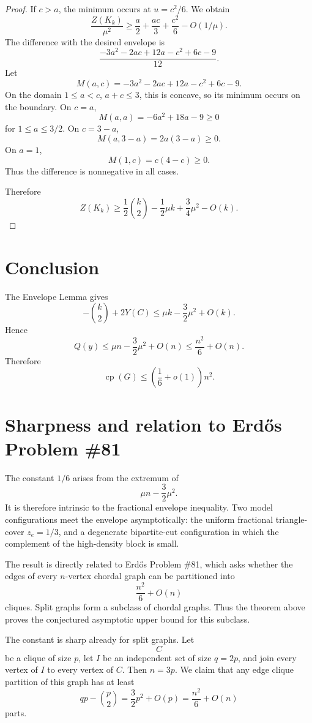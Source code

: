 \documentclass[11pt]{article}
\newcommand{\cp}{\operatorname{cp}}
\begin{document}
\begin{proof}
If \(c>a\), the minimum occurs at \(u=c^2/6\). We obtain
\[
    \frac{Z(K_k)}{\mu^2}
    \ge
    \frac a2+\frac{ac}{3}+\frac{c^2}{6}-O(1/\mu).
\]
The difference with the desired envelope is
\[
    \frac{-3a^2-2ac+12a-c^2+6c-9}{12}.
\]
Let
\[
    M(a,c)=-3a^2-2ac+12a-c^2+6c-9.
\]
On the domain \(1\le a<c\), \(a+c\le3\), this is concave, so its minimum occurs on the boundary. On \(c=a\),
\[
    M(a,a)=-6a^2+18a-9\ge0
\]
for \(1\le a\le3/2\). On \(c=3-a\),
\[
    M(a,3-a)=2a(3-a)\ge0.
\]
On \(a=1\),
\[
    M(1,c)=c(4-c)\ge0.
\]
Thus the difference is nonnegative in all cases.

Therefore
\[
    Z(K_k)
    \ge
    \frac12\binom{k}{2}
    -
    \frac12\mu k
    +
    \frac34\mu^2
    -
    O(k).
\]
\end{proof}

\section{Conclusion}

The Envelope Lemma gives
\[
    -\binom{k}{2}+2Y(C)
    \le
    \mu k-\frac32\mu^2+O(k).
\]
Hence
\[
    Q(y)
    \le
    \mu n-\frac32\mu^2+O(n)
    \le
    \frac{n^2}{6}+O(n).
\]
Therefore
\[
    \cp(G)
    \le
    \left(\frac16+o(1)\right)n^2.
\]

\section{Sharpness and relation to Erdős Problem \#81}\label{sec:sharpness}

The constant \(1/6\) arises from the extremum of
\[
    \mu n-\frac32\mu^2.
\]
It is therefore intrinsic to the fractional envelope inequality. Two model configurations meet the envelope asymptotically: the uniform fractional triangle-cover \(z_e=1/3\), and a degenerate bipartite-cut configuration in which the complement of the high-density block is small.

The result is directly related to Erdős Problem \#81, which asks whether the edges of every \(n\)-vertex chordal graph can be partitioned into
\[
    \frac{n^2}{6}+O(n)
\]
cliques. Split graphs form a subclass of chordal graphs. Thus the theorem above proves the conjectured asymptotic upper bound for this subclass.

The constant is sharp already for split graphs. Let
\[
    C
\]
be a clique of size \(p\), let \(I\) be an independent set of size \(q=2p\), and join every vertex of \(I\) to every vertex of \(C\). Then \(n=3p\). We claim that any edge clique partition of this graph has at least
\[
    qp-\binom{p}{2}
    =
    \frac32p^2+O(p)
    =
    \frac{n^2}{6}+O(n)
\]
parts.
\end{document}
